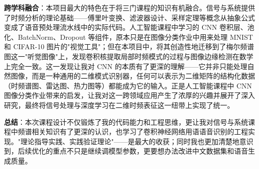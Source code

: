 ﻿\documentclass[12pt,a4paper]{article}
\begin{document}
\textbf{跨学科融合}：本项目最大的特色在于将三门课程的知识有机融合。信号与系统提供了时频分析的理论基础——傅里叶变换、滤波器设计、采样定理等概念从抽象公式变成了语音预处理流水线中的实际代码。人工智能课程中学习的 CNN 卷积层、池化、BatchNorm、Dropout 等组件，原本只是在图像分类作业中用来处理 MNIST 和 CIFAR-10 图片的"视觉工具"；但在本项目中，将其创造性地迁移到了梅尔频谱图这一"听觉图像"上，发现卷积核提取局部时频模式的过程与图像边缘检测在数学上完全一致。这一发现让我对 CNN 的本质有了更深的理解——它并非只能处理自然图像，而是一种通用的二维模式识别器，任何可以表示为二维矩阵的结构化数据（时频谱图、雷达图、热力图等）都能成为它的输入。正是人工智能课程中 CNN 图像分类作业带来的启发，让我对这一跨领域应用产生了浓厚的兴趣并展开了深入研究，最终将信号处理与深度学习在二维时频表征这一纽带上实现了统一。

\textbf{总结}：本次课程设计不仅锻炼了我的代码能力和工程思维，更让我对信号与系统课程中频谱相关知识有了更深的认识，也学习了卷积神经网络用语语音识别的工程实现。"理论指导实践、实践验证理论"——是最大的收获；同时我也更加清楚地意识到，后续优化的重点不只是继续调模型参数，更要想办法改进中文数据集和语音生成质量。
\end{document}
